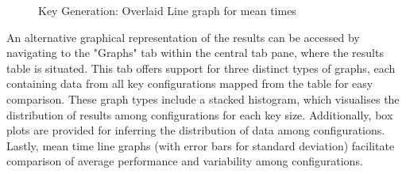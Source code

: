 \documentclass[]{final_report}
\theoremstyle{definition}
\begin{document}
\begin{figure}[H]
\begin{minipage}{0.7\textwidth}
        \caption{Key Generation: Overlaid Line graph for mean times}
        \label{fig:image2}
    \end{minipage}
\end{figure}
An alternative graphical representation of the results can be accessed by navigating to the "Graphs" tab within the central tab pane, where the results table is situated. This tab offers support for three distinct types of graphs, each containing data from all key configurations mapped from the table for easy comparison. These graph types include a stacked histogram, which visualises the distribution of results among configurations for each key size. Additionally, box plots are provided for inferring the distribution of data among configurations. Lastly, mean time line graphs (with error bars for standard deviation) facilitate comparison of average performance and variability among configurations.
\end{document}

